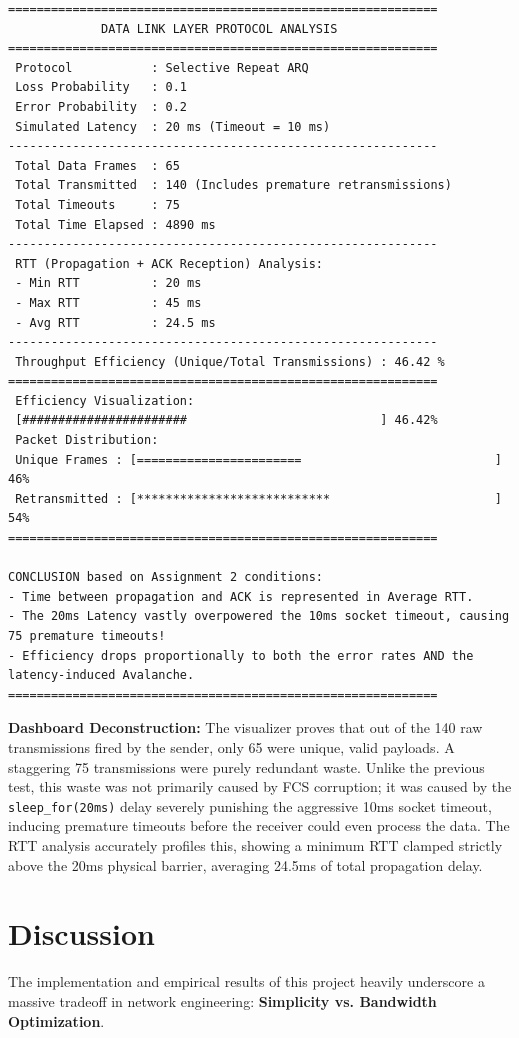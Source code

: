 \documentclass[12pt, a4paper]{article}
\begin{document}
\begin{verbatim}
============================================================
             DATA LINK LAYER PROTOCOL ANALYSIS              
============================================================
 Protocol           : Selective Repeat ARQ
 Loss Probability   : 0.1
 Error Probability  : 0.2
 Simulated Latency  : 20 ms (Timeout = 10 ms)
------------------------------------------------------------
 Total Data Frames  : 65
 Total Transmitted  : 140 (Includes premature retransmissions)
 Total Timeouts     : 75
 Total Time Elapsed : 4890 ms
------------------------------------------------------------
 RTT (Propagation + ACK Reception) Analysis:
 - Min RTT          : 20 ms
 - Max RTT          : 45 ms
 - Avg RTT          : 24.5 ms
------------------------------------------------------------
 Throughput Efficiency (Unique/Total Transmissions) : 46.42 %
============================================================
 Efficiency Visualization:
 [#######################                           ] 46.42%
 Packet Distribution:
 Unique Frames : [=======================                           ] 46%
 Retransmitted : [***************************                       ] 54%
============================================================

CONCLUSION based on Assignment 2 conditions:
- Time between propagation and ACK is represented in Average RTT.
- The 20ms Latency vastly overpowered the 10ms socket timeout, causing 75 premature timeouts!
- Efficiency drops proportionally to both the error rates AND the latency-induced Avalanche.
============================================================
\end{verbatim}

\textbf{Dashboard Deconstruction:} The visualizer proves that out of the 140 raw transmissions fired by the sender, only 65 were unique, valid payloads. A staggering 75 transmissions were purely redundant waste. Unlike the previous test, this waste was not primarily caused by FCS corruption; it was caused by the \texttt{sleep\_for(20ms)} delay severely punishing the aggressive 10ms socket timeout, inducing premature timeouts before the receiver could even process the data. The RTT analysis accurately profiles this, showing a minimum RTT clamped strictly above the 20ms physical barrier, averaging 24.5ms of total propagation delay.



\section{Discussion}
The implementation and empirical results of this project heavily underscore a massive tradeoff in network engineering: \textbf{Simplicity vs. Bandwidth Optimization}.
\end{document}
